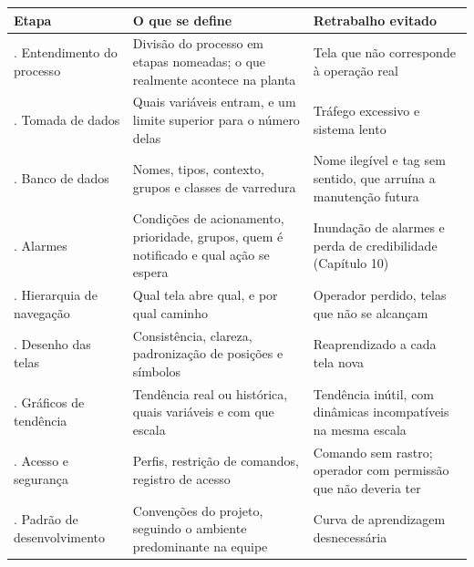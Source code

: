 \begin{longtable}[]{@{}
  >{\raggedright\arraybackslash}p{}
  >{\raggedright\arraybackslash}p{}
  >{\raggedright\arraybackslash}p{}@{}}
\toprule\noalign{}
\begin{minipage}[b]{\linewidth}\raggedright
Etapa
\end{minipage} & \begin{minipage}[b]{\linewidth}\raggedright
O que se define
\end{minipage} & \begin{minipage}[b]{\linewidth}\raggedright
Retrabalho evitado
\end{minipage} \\
\midrule\noalign{}
\endhead
\bottomrule\noalign{}
\endlastfoot
1. Entendimento do processo & Divisão do processo em etapas nomeadas; o que realmente acontece na planta & Tela que não corresponde à operação real \\
2. Tomada de dados & Quais variáveis entram, e um limite superior para o número delas & Tráfego excessivo e sistema lento \\
3. Banco de dados & Nomes, tipos, contexto, grupos e classes de varredura & Nome ilegível e tag sem sentido, que arruína a manutenção futura \\
4. Alarmes & Condições de acionamento, prioridade, grupos, quem é notificado e qual ação se espera & Inundação de alarmes e perda de credibilidade (Capítulo 10) \\
5. Hierarquia de navegação & Qual tela abre qual, e por qual caminho & Operador perdido, telas que não se alcançam \\
6. Desenho das telas & Consistência, clareza, padronização de posições e símbolos & Reaprendizado a cada tela nova \\
7. Gráficos de tendência & Tendência real ou histórica, quais variáveis e com que escala & Tendência inútil, com dinâmicas incompatíveis na mesma escala \\
8. Acesso e segurança & Perfis, restrição de comandos, registro de acesso & Comando sem rastro; operador com permissão que não deveria ter \\
9. Padrão de desenvolvimento & Convenções do projeto, seguindo o ambiente predominante na equipe & Curva de aprendizagem desnecessária \\
\end{longtable}


